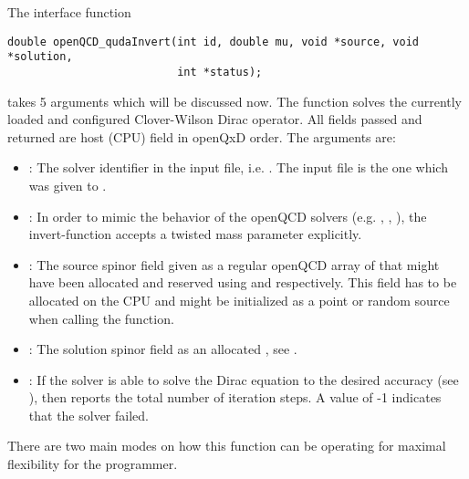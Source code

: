 The interface function
\begin{verbatim}
double openQCD_qudaInvert(int id, double mu, void *source, void *solution,
                          int *status);
\end{verbatim}
takes 5 arguments which will be discussed now. The function solves the currently loaded and configured Clover-Wilson Dirac operator. All fields passed and returned are host (CPU) field in openQxD order. The arguments are:
\begin{itemize}
  \item {}: The solver identifier in the input file, i.e. . The input file is the one which was given to .
  \item {}: In order to mimic the behavior of the openQCD solvers (e.g. , , ), the invert-function accepts a twisted mass parameter  explicitly.
  \item {}: The source spinor field given as a regular openQCD array of  that might have been allocated and reserved using  and  respectively. This field has to be allocated on the CPU and might be initialized as a point or random source when calling the function.
  \item {}: The solution spinor field as an allocated , see .
  \item {}: If the solver is able to solve the Dirac equation to the desired accuracy (see ), then  reports the total number of iteration steps. A value of -1 indicates that the solver failed.
\end{itemize}

There are two main modes on how this function can be operating for maximal flexibility for the programmer.

